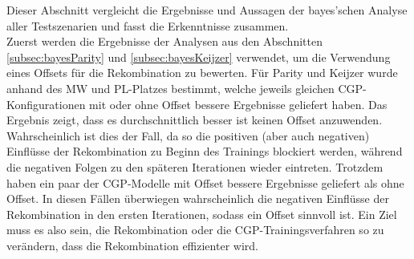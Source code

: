 Dieser Abschnitt vergleicht die Ergebnisse und Aussagen der bayes'schen Analyse aller Testszenarien und fasst die Erkenntnisse zusammen.\\
Zuerst werden die Ergebnisse der Analysen aus den Abschnitten \ref{subsec:bayesParity} und \ref{subsec:bayesKeijzer} verwendet, um die Verwendung eines Offsets für die Rekombination zu bewerten.
Für Parity und Keijzer wurde anhand des MW und PL-Platzes bestimmt, welche jeweils gleichen CGP-Konfigurationen mit oder ohne Offset bessere Ergebnisse geliefert haben.
Das Ergebnis zeigt, dass es durchschnittlich besser ist keinen Offset anzuwenden.
Wahrscheinlich ist dies der Fall, da so die positiven (aber auch negativen) Einflüsse der Rekombination zu Beginn des Trainings blockiert werden, während die negativen Folgen zu den späteren Iterationen wieder eintreten.
Trotzdem haben ein paar der CGP-Modelle mit Offset bessere Ergebnisse geliefert als ohne Offset.
In diesen Fällen überwiegen wahrscheinlich die negativen Einflüsse der Rekombination in den ersten Iterationen, sodass ein Offset sinnvoll ist.
Ein Ziel muss es also sein, die Rekombination oder die CGP-Trainingsverfahren so zu verändern, dass die Rekombination effizienter wird.

